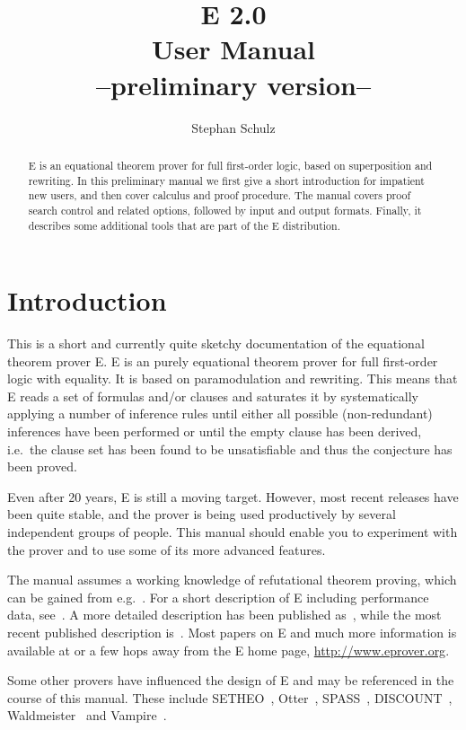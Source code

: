 \documentclass{report}
\author{Stephan Schulz}
\title{E 2.0\\[1.5ex]User Manual\\[1.5ex]{\normalsize --preliminary
    version--}}
\begin{document}
\maketitle{}

\begin{abstract}
  E is an equational theorem prover for full first-order logic, based
  on superposition and rewriting. In this preliminary manual we first
  give a short introduction for impatient new users, and then cover
  calculus and proof procedure. The manual covers proof search control
  and related options, followed by input and output formats. Finally,
  it describes some additional tools that are part of the E
  distribution.
\end{abstract}

\tableofcontents{}

\chapter{Introduction}
\label{sec:intro}

This is a short and currently quite sketchy documentation of the
equational theorem prover E. E is an purely equational theorem prover
for full first-order logic with equality. It is based on
paramodulation and rewriting. This means that E reads a set of
formulas and/or clauses and saturates it by systematically applying a
number of inference rules until either all possible (non-redundant)
inferences have been performed or until the empty clause has been
derived, i.e.\ the clause set has been found to be unsatisfiable and
thus the conjecture has been proved.

Even after 20 years, E is still a moving target. However, most recent
releases have been quite stable, and the prover is being used
productively by several independent groups of people. This manual
should enable you to experiment with the prover and to use some of its
more advanced features.

The manual assumes a working knowledge of refutational theorem
proving, which can be gained from e.g.~\cite{CL73}. For a short
description of E including performance data,
see~\cite{Schulz:IJCAR-2004}. A more detailed description has been
published as~\cite{Schulz:AICOM-2002}, while the most recent published
description is~\cite{Schulz:LPAR-2013}. Most papers on E and much more
information is available at or a few hops away from the E home page,
\url{http://www.eprover.org}.

Some other provers have influenced the design of E and may be
referenced in the course of this manual. These include
SETHEO~\cite{MILSGSM:JAR-97},
Otter~\cite{Mc94,MW:JAR-97},
SPASS~\cite{WGR96,WABCEKTT:CADE-99},
DISCOUNT~\cite{DKS97}, Waldmeister~\cite{BHF96,HJL:CADE-99} and
Vampire~\cite{RV:AICOM-2002,RV:IJCAR-2001}.
\end{document}
